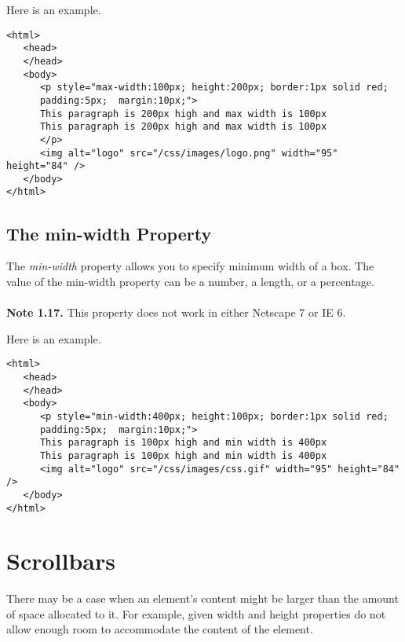 \documentclass[a4paper,oneside]{book}
\numberwithin{equation}{chapter}
\begin{document}
Here is an example.
\begin{verbatim}
<html>
   <head>
   </head>
   <body>
      <p style="max-width:100px; height:200px; border:1px solid red; 
      padding:5px;  margin:10px;">
      This paragraph is 200px high and max width is 100px
      This paragraph is 200px high and max width is 100px
      </p>
      <img alt="logo" src="/css/images/logo.png" width="95" height="84" />
   </body>
</html> 
\end{verbatim}
\subsection{The min-width Property}
The \textit{min-width} property allows you to specify minimum width of a box. The value of the min-width property can be a number, a length, or a percentage.\\
\\
\textbf{Note 1.17.} This property does not work in either Netscape 7 or IE 6.

Here is an example.
\begin{verbatim}
<html>
   <head>
   </head>
   <body>
      <p style="min-width:400px; height:100px; border:1px solid red; 
      padding:5px;  margin:10px;">
      This paragraph is 100px high and min width is 400px
      This paragraph is 100px high and min width is 400px
      <img alt="logo" src="/css/images/css.gif" width="95" height="84" />
   </body>
</html> 
\end{verbatim}
\section{Scrollbars}
There may be a case when an element's content might be larger than the amount of space allocated to it. For example, given width and height properties do not allow enough room to accommodate the content of the element.
\end{document}
